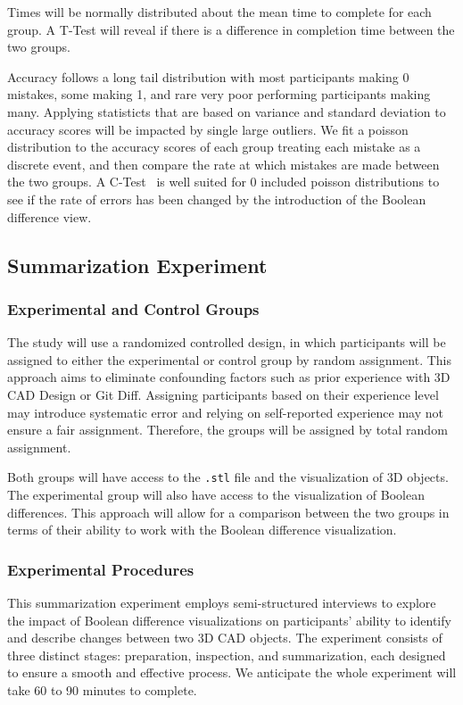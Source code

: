 \documentclass[sigconf,authorversion,nonacm]{acmart}
\begin{document}
Times will be normally distributed about the mean time to complete for each group.
A T-Test will reveal if there is a difference in completion time between the two groups.

Accuracy follows a long tail distribution with most participants making 0 mistakes, some making 1, and rare very poor performing participants making many.
Applying statisticts that are based on variance and standard deviation to accuracy scores will be impacted by single large outliers.
We fit a poisson distribution to the accuracy scores of each group treating each mistake as a discrete event, and then compare the rate at which mistakes are made between the two groups.
A C-Test~\cite{przyborowski1940homogeneity} is well suited for 0 included poisson distributions to see if the rate of errors has been changed by the introduction of the Boolean difference view.


\subsection{Summarization Experiment}
\subsubsection{Experimental and Control Groups}

The study will use a randomized controlled design, in which participants will be assigned to either the experimental or control group by random assignment. This approach aims to eliminate confounding factors such as prior experience with 3D CAD Design or Git Diff. Assigning participants based on their experience level may introduce systematic error and relying on self-reported experience may not ensure a fair assignment. Therefore, the groups will be assigned by total random assignment.

Both groups will have access to the \texttt{.stl} file and the visualization of 3D objects. The experimental group will also have access to the visualization of Boolean differences. This approach will allow for a comparison between the two groups in terms of their ability to work with the Boolean difference visualization.
\subsubsection{Experimental Procedures}
This summarization experiment employs semi-structured interviews to explore the impact of Boolean difference visualizations on participants' ability to identify and describe changes between two 3D CAD objects. 
The experiment consists of three distinct stages: preparation, inspection, and summarization, each designed to ensure a smooth and effective process. We anticipate the whole experiment will take 60 to 90 minutes to complete.
\end{document}
